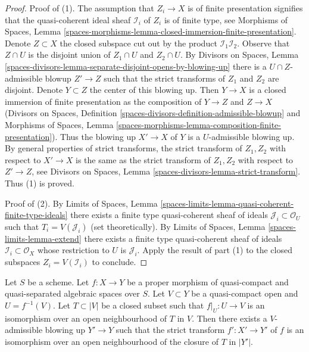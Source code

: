 \begin{proof}
Proof of (1). The assumption that $Z_i \to X$ is of finite presentation
signifies that the quasi-coherent ideal sheaf $\mathcal{I}_i$ of $Z_i$
is of finite type, see 
Morphisms of Spaces, Lemma
\ref{spaces-morphisms-lemma-closed-immersion-finite-presentation}.
Denote $Z \subset X$ the closed subspace
cut out by the product $\mathcal{I}_1 \mathcal{I}_2$.
Observe that $Z \cap U$ is the disjoint union
of $Z_1 \cap U$ and $Z_2 \cap U$. By Divisors on Spaces, Lemma
\ref{spaces-divisors-lemma-separate-disjoint-opens-by-blowing-up}
there is a $U \cap Z$-admissible blowup $Z' \to Z$ such that
the strict transforms of $Z_1$ and $Z_2$ are disjoint.
Denote $Y \subset Z$ the center of this blowing up.
Then $Y \to X$ is a closed immersion of finite presentation as the composition
of $Y \to Z$ and $Z \to X$ (Divisors on Spaces, Definition
\ref{spaces-divisors-definition-admissible-blowup} and
Morphisms of Spaces, Lemma
\ref{spaces-morphisms-lemma-composition-finite-presentation}).
Thus the blowing up $X' \to X$ of $Y$ is a $U$-admissible blowing
up. By general properties of strict transforms, the
strict transform of $Z_1, Z_2$ with respect to $X' \to X$
is the same as the strict transform of $Z_1, Z_2$ with respect
to $Z' \to Z$, see
Divisors on Spaces, Lemma \ref{spaces-divisors-lemma-strict-transform}.
Thus (1) is proved.

\medskip\noindent
Proof of (2). By Limits of Spaces, Lemma
\ref{spaces-limits-lemma-quasi-coherent-finite-type-ideals}
there exists a finite type quasi-coherent sheaf of ideals
$\mathcal{J}_i \subset \mathcal{O}_U$ such that
$T_i = V(\mathcal{J}_i)$ (set theoretically).
By Limits of Spaces, Lemma \ref{spaces-limits-lemma-extend}
there exists a finite type quasi-coherent sheaf
of ideals $\mathcal{I}_i \subset \mathcal{O}_X$
whose restriction to $U$ is $\mathcal{J}_i$.
Apply the result of part (1) to the closed
subspaces $Z_i = V(\mathcal{I}_i)$ to conclude.
\end{proof}

\begin{lemma}
\label{lemma-blowup-iso-along}
Let $S$ be a scheme. Let $f : X \to Y$ be a proper morphism of quasi-compact
and quasi-separated algebraic spaces over $S$. Let $V \subset Y$ be a
quasi-compact open and $U = f^{-1}(V)$. Let $T \subset |V|$ be a closed subset
such that $f|_U : U \to V$ is an isomorphism over an open neighbourhood of $T$
in $V$. Then there exists a $V$-admissible blowing up $Y' \to Y$ such that
the strict transform $f' : X' \to Y'$ of $f$ is an isomorphism over an open
neighbourhood of the closure of $T$ in $|Y'|$.
\end{lemma}

